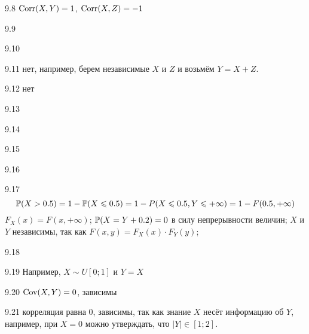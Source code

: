 \protect \hypertarget {soln:9.8}{}
\begin{solution}{{9.8}}
$\Corr(X,Y)=1$, $\Corr(X,Z)=-1$
\end{solution}
\protect \hypertarget {soln:9.9}{}
\begin{solution}{{9.9}}
\end{solution}
\protect \hypertarget {soln:9.10}{}
\begin{solution}{{9.10}}
\end{solution}
\protect \hypertarget {soln:9.11}{}
\begin{solution}{{9.11}}
  нет, например, берем независимые $X$ и $Z$ и возьмём $Y=X+Z$.
\end{solution}
\protect \hypertarget {soln:9.12}{}
\begin{solution}{{9.12}}
нет
\end{solution}
\protect \hypertarget {soln:9.13}{}
\begin{solution}{{9.13}}
\end{solution}
\protect \hypertarget {soln:9.14}{}
\begin{solution}{{9.14}}
\end{solution}
\protect \hypertarget {soln:9.15}{}
\begin{solution}{{9.15}}
\end{solution}
\protect \hypertarget {soln:9.16}{}
\begin{solution}{{9.16}}
\end{solution}
\protect \hypertarget {soln:9.17}{}
\begin{solution}{{9.17}}
  \[
  \P(X>0.5) = 1 - \P(X\leq 0.5) = 1 - P(X\leq 0.5, Y\leq +\infty) = 1 - F(0.5, +\infty)
  \]
  $F_X(x)=F(x, +\infty)$; $\P(X=Y+0.2)=0$ в силу непрерывности величин; $X$ и $Y$ независимы, так как $F(x,y)=F_X(x)\cdot F_Y(y)$;
\end{solution}
\protect \hypertarget {soln:9.18}{}
\begin{solution}{{9.18}}
\end{solution}
\protect \hypertarget {soln:9.19}{}
\begin{solution}{{9.19}}
  Например, $X\sim U[0;1]$ и $Y=X$
\end{solution}
\protect \hypertarget {soln:9.20}{}
\begin{solution}{{9.20}}
    $\Cov(X,Y)=0$, зависимы
\end{solution}
\protect \hypertarget {soln:9.21}{}
\begin{solution}{{9.21}}
  корреляция равна $0$, зависимы, так как знание $X$ несёт информацию об $Y$, например, при $X=0$ можно утверждать, что $|Y| \in [1;2]$.
\end{solution}
